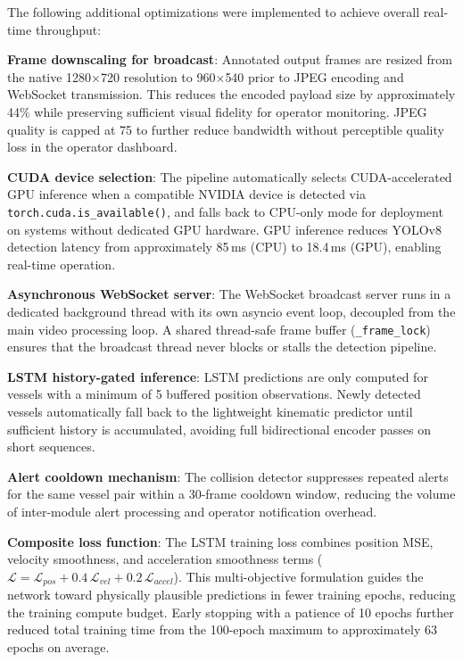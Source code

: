 The following additional optimizations were implemented to achieve overall real-time throughput:

\textbf{Frame downscaling for broadcast}: Annotated output frames are resized from the native 1280$\times$720 resolution to 960$\times$540 prior to JPEG encoding and WebSocket transmission. This reduces the encoded payload size by approximately 44\% while preserving sufficient visual fidelity for operator monitoring. JPEG quality is capped at 75 to further reduce bandwidth without perceptible quality loss in the operator dashboard.

\textbf{CUDA device selection}: The pipeline automatically selects CUDA-accelerated GPU inference when a compatible NVIDIA device is detected via \texttt{torch.cuda.is\_available()}, and falls back to CPU-only mode for deployment on systems without dedicated GPU hardware. GPU inference reduces YOLOv8 detection latency from approximately 85\,ms (CPU) to 18.4\,ms (GPU), enabling real-time operation.

\textbf{Asynchronous WebSocket server}: The WebSocket broadcast server runs in a dedicated background thread with its own asyncio event loop, decoupled from the main video processing loop. A shared thread-safe frame buffer (\texttt{\_frame\_lock}) ensures that the broadcast thread never blocks or stalls the detection pipeline.

\textbf{LSTM history-gated inference}: LSTM predictions are only computed for vessels with a minimum of 5 buffered position observations. Newly detected vessels automatically fall back to the lightweight kinematic predictor until sufficient history is accumulated, avoiding full bidirectional encoder passes on short sequences.

\textbf{Alert cooldown mechanism}: The collision detector suppresses repeated alerts for the same vessel pair within a 30-frame cooldown window, reducing the volume of inter-module alert processing and operator notification overhead.

\textbf{Composite loss function}: The LSTM training loss combines position MSE, velocity smoothness, and acceleration smoothness terms ($\mathcal{L} = \mathcal{L}_{pos} + 0.4\,\mathcal{L}_{vel} + 0.2\,\mathcal{L}_{accel}$). This multi-objective formulation guides the network toward physically plausible predictions in fewer training epochs, reducing the training compute budget. Early stopping with a patience of 10 epochs further reduced total training time from the 100-epoch maximum to approximately 63 epochs on average.

